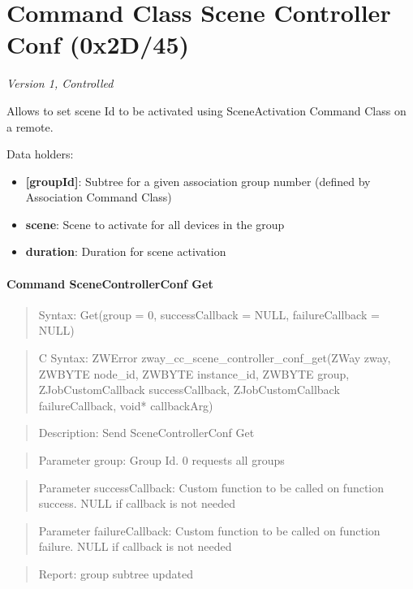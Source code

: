 \section{Command Class Scene Controller Conf (0x2D/45)}

\textit{Version 1, Controlled}
\newline

Allows to set scene Id to be activated using SceneActivation Command Class on a remote.
\newline

\noindent
Data holders:

\begin{itemize}
\item \textbf{[groupId]}: Subtree for a given association group number (defined by Association Command Class)
\item \qquad\textbf{scene}: Scene to activate for all devices in the group
\item \qquad\textbf{duration}: Duration for scene activation
\end{itemize}

\paragraph{Command SceneControllerConf Get}
\begin{quote}Syntax: Get(group = 0, successCallback = NULL, failureCallback = NULL)\end{quote}
\begin{quote}C Syntax: ZWError zway\_cc\_scene\_controller\_conf\_get(ZWay zway, ZWBYTE node\_id, ZWBYTE instance\_id, ZWBYTE group, ZJobCustomCallback successCallback, ZJobCustomCallback failureCallback, void* callbackArg)\end{quote}
\begin{quote}Description: Send SceneControllerConf Get\end{quote}
\begin{quote}Parameter group: Group Id. 0 requests all groups\end{quote}
\begin{quote}Parameter successCallback: Custom function to be called on function success. NULL if callback is not needed\end{quote}
\begin{quote}Parameter failureCallback: Custom function to be called on function failure. NULL if callback is not needed\end{quote}
\begin{quote}Report: group subtree updated\end{quote}

